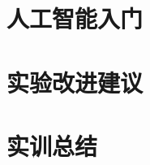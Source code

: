 \documentclass[a4paper,twoside,zihao=5,UTF8]{ctexart}
\begin{document}
\begin{spacing}{1.2}
\begin{enumerate}
	
\end{enumerate}

\section{人工智能入门}


\section{实验改进建议}


\section{实训总结}


\end{spacing}
\end{document}
